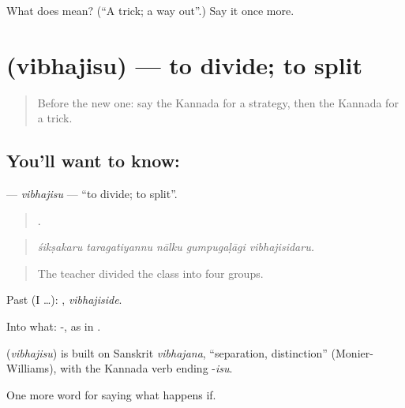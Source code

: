 \begin{tcolorbox}[breakable,colback=teal!4,colframe=teal!35!black,title={Before you move on}]
What does  mean? (\textquotedblleft{}A trick; a way out\textquotedblright{}.) Say it once more.
\end{tcolorbox}
\section[\texorpdfstring{\kn{ವಿಭಜಿಸು} (vibhajisu)}{ವಿಭಜಿಸು (vibhajisu)}]{ (vibhajisu) — to divide; to split}

\label{lesson:KA-C423-vibhajisu}



\begin{quote}
Before the new one: say the Kannada for a strategy, then the Kannada for a trick.
\end{quote}

\subsection*{You'll want to know: }
\textbf{} — \emph{vibhajisu} — \textquotedblleft{}to divide; to split\textquotedblright{}.

\begin{quote}
    .
\end{quote}

\begin{quote}
\emph{śikṣakaru taragatiyannu nālku gumpugaḷāgi vibhajisidaru.}
\end{quote}

\begin{quote}
The teacher divided the class into four groups.
\end{quote}

Past (I …): , \emph{vibhajiside}.

Into what: -, as in .

\begin{cousinweb}
\textbf{} (\emph{vibhajisu}) is built on Sanskrit \emph{vibhajana}, \textquotedblleft{}separation, distinction\textquotedblright{} (Monier-Williams), with the Kannada verb ending -\emph{isu}.
\end{cousinweb}

\begin{grammarlens}[title={What you've built}]
One more word for saying what happens if.
\end{grammarlens}

